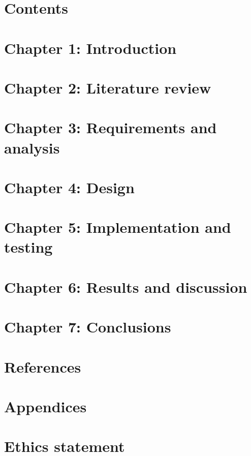 \documentclass{article}
\begin{document}
\newpage

\section{Contents}
\tableofcontents
\blindtext
\newpage

\section{Chapter 1: Introduction}
\blindtext
\newpage

\section{Chapter 2: Literature review}
\blindtext
\newpage

\section{Chapter 3: Requirements and analysis}
\blindtext
\newpage

\section{Chapter 4: Design}
\blindtext
\newpage

\section{Chapter 5: Implementation and testing}
\blindtext
\newpage

\section{Chapter 6: Results and discussion}
\blindtext
\newpage

\section{Chapter 7: Conclusions}
\blindtext
\newpage

\section{References}
\blindtext
\newpage

\section{Appendices}
\blindtext
\newpage

\section{Ethics statement}
\blindtext
\newpage
\end{document}
